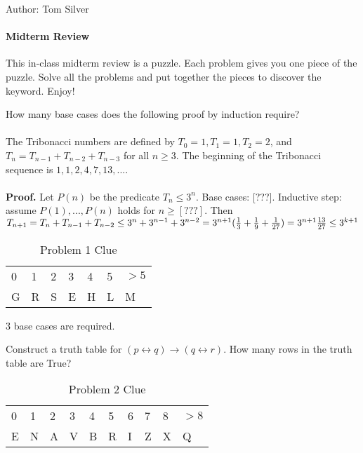 \documentclass[solution, letterpaper]{cs20inclass}
\begin{document}

\noindent Author: Tom Silver%

\paragraph*{Midterm Review}
This in-class midterm review is a puzzle. Each problem gives you one piece of the puzzle. Solve all the problems and put together the pieces to discover the keyword. Enjoy!

\problem How many base cases does the following proof by induction require?
\\
\\ The Tribonacci numbers are defined by $T_0 = 1, T_1 = 1, T_2 = 2$, and $T_n = T_{n-1} + T_{n-2} + T_{n-3}$ for all $n \ge 3$. The beginning of the Tribonacci sequence is $1, 1, 2, 4, 7, 13, ...$. 
\\
\\ \textbf{Proof.} Let $P(n)$ be the predicate $T_n \le 3^n$. Base cases: [???]. Inductive step: assume $P(1), ..., P(n)$ holds for $n \ge [???]$. Then 
\begin{math}
T_{n+1} = T_n + T_{n-1} + T_{n-2}
\\ \le 3^n + 3^{n-1} + 3^{n-2}
\\ = 3^{n+1}(\frac{1}{3} + \frac{1}{9} + \frac{1}{27})
\\ = 3^{n+1}\frac{13}{27}
\\ \le 3^{k+1}
\end{math} 


\begin{table}[h]
\centering
\begin{tabular}{lllllll}
0 & 1 & 2 & 3 & 4 & 5 & $>5$ \\
G & R & S & E & H & L & M
\end{tabular}
\caption*{Problem 1 Clue}
\end{table}

\begin{solution}
3 base cases are required.
\end{solution}

\problem Construct a truth table for $(p \leftrightarrow q) \to (q \leftrightarrow r)$. How many rows in the truth table are True?

\begin{table}[h]
\centering
\begin{tabular}{llllllllll}
0 & 1 & 2 & 3 & 4 & 5 & 6 & 7 & 8 & $>8$ \\
E & N & A & V & B & R & I & Z & X & Q            
\end{tabular}
\caption*{Problem 2 Clue}
\end{table}
\end{document}
